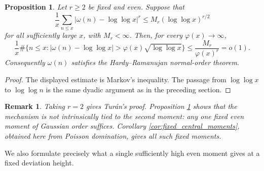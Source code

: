 \documentclass[12pt,a4paper,reqno]{amsart}
\theoremstyle{plain}
\newtheorem{prpstn}[thrm]{Proposition}
\newtheorem*{rmk}{Remark}
\numberwithin{sblmm}{thrm}
\numberwithin{equation}{section}
\renewcommand{\phi}{\varphi}
\begin{document}
\begin{prpstn}\label{prop:one_even_moment}
    Let $r\ge 2$ be fixed and even. Suppose that
    $$\frac{1}{x}\sum_{n\le x}|\omega(n)-\log\log x|^r\le M_r(\log\log x)^{r/2}$$
    for all sufficiently large $x$, with $M_r<\infty$. Then, for every $\phi(x)\to\infty$,
    $$\frac{1}{x}\#\{n\le x:|\omega(n)-\log\log x|>\phi(x)\sqrt{\log\log x}\}\le\frac{M_r}{\phi(x)^r}=o(1).$$
    Consequently $\omega(n)$ satisfies the Hardy--Ramanujan normal-order theorem.
\end{prpstn}
\begin{proof}
    The displayed estimate is Markov's inequality. The passage from $\log\log x$ to $\log\log n$ is the same dyadic argument as in the preceding section.
\end{proof}

\begin{rmk}
    Taking $r=2$ gives Tur\'{a}n's proof. Proposition \ref{prop:one_even_moment} shows that the mechanism is not intrinsically tied to the second moment: any one fixed even moment of Gaussian order suffices. Corollary \ref{cor:fixed_central_moments}, obtained here from Poisson domination, gives all such fixed moments.
\end{rmk}

We also formulate precisely what a single sufficiently high even moment gives at a fixed deviation height.
\end{document}
